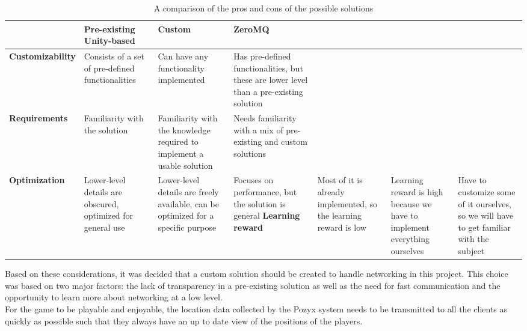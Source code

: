 \begin{table}[H]
    \begin{tabularx}{\textwidth}{|X|X|X|X|}
    \hline
       
            & \textbf{Pre-existing Unity-based}    
            & \textbf{Custom}
            & \textbf{ZeroMQ}  
            \\ \hline
        \textbf{Customizability} 
            & Consists of a set of pre-defined functionalities            
            & Can have any functionality implemented                                            
            & Has pre-defined functionalities, but these are lower level than a pre-existing solution 
            \\ \hline
        \textbf{Requirements}    
            & Familiarity with the solution                               
            & Familiarity with the knowledge required to implement a usable solution            
            & Needs familiarity with a mix of pre-existing and custom solutions                     
            \\ \hline
        \textbf{Optimization}    
            & Lower-level details are obscured, optimized for general use 
            & Lower-level details are freely available, can be optimized for a specific purpose 
            & Focuses on performance, but the solution is general                                     
        \textbf{Learning reward}
         & Most of it is already implemented, so the learning reward is low
         & Learning reward is high because we have to implement everything ourselves
         & Have to customize some of it ourselves, so we will have to get familiar with the subject
        \\ \hline
    \end{tabularx}
    \caption{A comparison of the pros and cons of the possible solutions}
    \label{tab:networkprosandcons}
\end{table}
\noindent
Based on these considerations, it was decided that a custom solution should be created to handle networking in this project.
This choice was based on two major factors: the lack of transparency in a pre-existing solution as well as the need for fast communication and the opportunity to learn more about networking at a low level. \\
For the game to be playable and enjoyable, the location data collected by the Pozyx system needs to be transmitted to all the clients as quickly as possible such that they always have an up to date view of the positions of the players.\\
